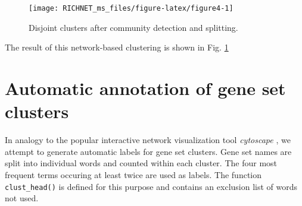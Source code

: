 \documentclass[9pt,a4paper,]{extarticle}
\theoremstyle{definition}
\theoremstyle{definition}
\theoremstyle{definition}
\theoremstyle{remark}
\begin{document}
\begin{figure}

{\centering \texttt{[image: RICHNET\_ms\_files/figure-latex/figure4-1]} 

}

\caption{Disjoint clusters after community detection and splitting.}\label{fig:figure4}
\end{figure}

The result of this network-based clustering is shown in Fig. \ref{fig:figure4}

\newpage

\section{Automatic annotation of gene set clusters}\label{automatic-annotation-of-gene-set-clusters}

In analogy to the popular interactive network visualization tool \emph{cytoscape} \citep{Kucera2016}, we attempt to generate automatic labels for gene set clusters. Gene set names are split into individual words and counted within each cluster. The four most frequent terms occuring at least twice are used as labels. The function \texttt{clust\_head()} is defined for this purpose and contains an exclusion list of words not used.
\end{document}
